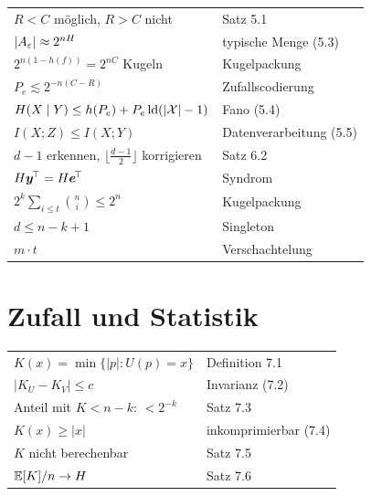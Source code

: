 \begin{merksatz}
\begin{center}
{\small
\renewcommand{\arraystretch}{1.62}
\begin{tabular}{@{}P{4.4cm}P{4.2cm}@{}}
\toprule
$R<C$ möglich, $R>C$ nicht & Satz 5.1\\
$|A_\varepsilon| \approx 2^{nH}$ & typische Menge (5.3)\\
$2^{n(1-h(f))} = 2^{nC}$ Kugeln & Kugelpackung\\
$P_e \lesssim 2^{-n(C-R)}$ & Zufallscodierung\\
$H(X\mid Y) \le h(P_e)+P_e\operatorname{ld}(|\mathcal X|-1)$ & Fano (5.4)\\
$I(X;Z) \le I(X;Y)$ & Datenverarbeitung (5.5)\\
$d-1$ erkennen, $\lfloor\frac{d-1}2\rfloor$ korrigieren & Satz 6.2\\
$H\boldsymbol{y}^{\!\top} = H\boldsymbol{e}^{\!\top}$ & Syndrom\\
$2^{k}\sum_{i\le t}\binom ni \le 2^{n}$ & Kugelpackung\\
$d \le n-k+1$ & Singleton\\
$m\cdot t$ & Verschachtelung\\
\bottomrule
\end{tabular}}
\end{center}
\end{merksatz}

\section{Zufall und Statistik}

\begin{merksatz}
\begin{center}
{\small
\renewcommand{\arraystretch}{1.62}
\begin{tabular}{@{}P{4.4cm}P{4.2cm}@{}}
\toprule
$K(x) = \min\{|p| : U(p)=x\}$ & Definition 7.1\\
$|K_U-K_V| \le c$ & Invarianz (7.2)\\
Anteil mit $K<n-k$: $<2^{-k}$ & Satz 7.3\\
$K(x) \ge |x|$ & inkomprimierbar (7.4)\\
$K$ nicht berechenbar & Satz 7.5\\
$\mathbb{E}[K]/n \to H$ & Satz 7.6\\
\bottomrule
\end{tabular}}
\end{center}
\end{merksatz}

